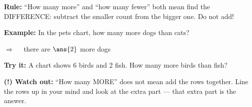 \documentclass[12pt]{article}
\begin{document}
\begin{formulabox}
\textbf{Rule:} ``How many more'' and ``how many fewer'' both mean find the
DIFFERENCE: subtract the smaller count from the bigger one. Do not add!
\end{formulabox}

\begin{examplebox}
\textbf{Example:} \quad In the pets chart, how many more dogs than cats?

$\Rightarrow\quad$ there are $\ans{2}$ more dogs
\end{examplebox}

\begin{tryitbox}
\textbf{Try it:} \quad A chart shows 6 birds and 2 fish. How many more birds
than fish?\\[2pt]
\end{tryitbox}

\begin{watchoutbox}
\textbf{(!) Watch out:} ``How many MORE'' does not mean add the rows
together. Line the rows up in your mind and look at the extra part --- that
extra part is the answer.
\end{watchoutbox}
\end{document}
